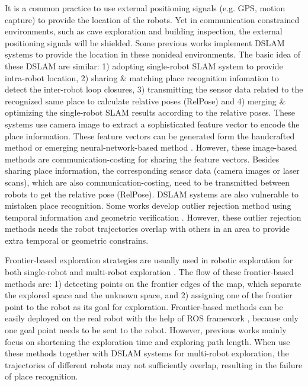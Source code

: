 It is a common practice to use external positioning signals (e.g. GPS, motion capture) to provide the location of the robots. 
Yet in communication constrained environments, such as cave exploration and building inspection, the external positioning signals will be shielded. 
Some previous works implement DSLAM systems \cite{cieslewski2018data, lajoie2020door, schmuck2019ccm} to provide the location in these nonideal environments. 
The basic idea of these DSLAM are similar: 1) adopting single-robot SLAM system to provide intra-robot location, 2) sharing \& matching place recognition infomation to detect the inter-robot loop closures, 3) transmitting the sensor data related to the recognized same place to calculate relative poses (RelPose) and 4) merging \& optimizing the single-robot SLAM results according to the relative poses. 
These systems use camera image to extract a sophisticated feature vector to encode the place information. 
These feature vectors can be generated form the handcrafted method \cite{jegou2014triang} or emerging neural-network-based method \cite{radenovic2018fine, arandjelovic2016netvlad}. 
However, these image-based methods are communication-costing for sharing the feature vectors. 
Besides sharing place information, the corresponding sensor data (camera images or laser scans), which are also communication-costing, need to be transmitted between robots to get the relative pose (RelPose).
DSLAM systems are also vulnerable to mistaken place recognition. Some works develop outlier rejection method using temporal information \cite{cieslewski2018data} and geometric verification \cite{lajoie2020door}. 
However, these outlier rejection methods needs the robot trajectories overlap with others in an area to provide extra temporal or geometric constrains.

Frontier-based exploration strategies are usually used in robotic exploration for both single-robot and multi-robot exploration \cite{senarathne2013efficient, umari2017autonomous, orvsulic2019efficient}.
The flow of these frontier-based methods are: 1) detecting points on the frontier edges of the map, which separate the explored space and the unknown space, and 2) assigning one of the frontier point to the robot as its goal for exploration. 
Frontier-based methods can be easily deployed on the real robot with the help of ROS framework \cite{quigley2009ros}, because only one goal point needs to be sent to the robot. 
However, previous works mainly focus on shortening the exploration time and exploring path length. 
When use these methods together with DSLAM systems for multi-robot exploration, the trajectories of different robots may not sufficiently overlap, resulting in the failure of place recognition.


